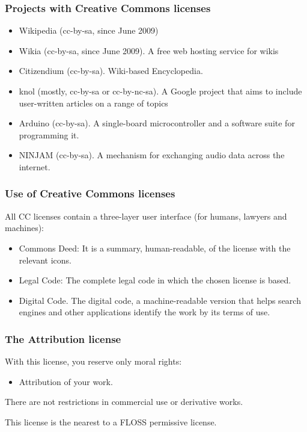 \begin{frame}
\frametitle{Projects with Creative Commons licenses}

\begin{itemize}
\item \alert{Wikipedia} (cc-by-sa, since June 2009)
\item \alert{Wikia} (cc-by-sa, since June 2009). A free web hosting service for wikis
\item \alert{Citizendium} (cc-by-sa). Wiki-based Encyclopedia.
\item \alert{knol} (mostly, cc-by-sa or cc-by-nc-sa). A Google project that aims to include user-written articles on a range of topics
\item \alert{Arduino} (cc-by-sa). A single-board microcontroller and a software suite for programming it. 
\item \alert{NINJAM} (cc-by-sa). A mechanism for exchanging audio data across the internet.
\end{itemize}                                                 

\end{frame}



\begin{frame}
\frametitle{Use of Creative Commons licenses}

All CC licenses contain a \alert{three-layer user interface} (for humans, lawyers and machines):
\begin{itemize}
\item \alert{Commons Deed:} It is a summary, human-readable, of the license with the relevant icons.
\item \alert{Legal Code:} The complete legal code in which the chosen license is based.
\item \alert{Digital Code.} The digital code, a machine-readable version that helps search engines and other applications identify the work by its terms of use.
\end{itemize}                                                 

\end{frame}


\begin{frame}
\frametitle{The Attribution license}

With this license, you reserve only moral rights:

\begin{itemize}
\item Attribution of your work.
\end{itemize}

There are not restrictions in commercial use or derivative works.

This license is the nearest to a FLOSS permissive license. 

\end{frame}


